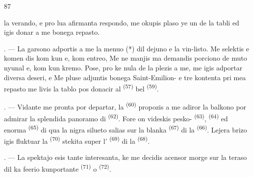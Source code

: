 \begin{VUpage}[89]{87}

\VUcontinue
la verando, e pro lua afirmanta respondo, me\nl
okupis plaso ye un de la tabli ed igis donar a\nl
me bonega repasto.

\VUsaut{4.0mm}
\VUsaut{3.0mm}

. --- La garsono adportis a me la menuo (*)\nl
dil dejuno e la vin-listo. Me selektis e komen\cc
dis kom  kun  e, kom\nl
entreo,  Me ne\nl
manjis  ma demandis porciono de muto\cc
nyunal  e, kom  kun\nl
kremo. Pose, pro ke nula de la  plezis\nl
a me, me igis adportar diversa deseri, \nl
{} e  Me pluse adjuntis bonega\nl
Saint-Emilion- e tre kontenta pri mea\nl
repasto me livis la tablo pos donacir al \cc
{} \textsuperscript{(57)} bel  \textsuperscript{(59)}.

. --- Vidante me pronta por departar, la\nl
{} \textsuperscript{(60)} propozis a me adiror la balkono por\nl
admirar la splendida panoramo di  \textsuperscript{(62)}.\nl
Fore on videskis pesko- \textsuperscript{(63)}, \cc
{} \textsuperscript{(64)} ed enorma  \textsuperscript{(65)} di qua la nigra\nl
silueto salias sur la blanka  \textsuperscript{(67)} di la \cc
{} \textsuperscript{(66)}. Lejera brizo igis fluktuar la \cc
{} \textsuperscript{(70)} stekita super l' \textsuperscript{(69)} di la\nl
{} \textsuperscript{(68)}.

\VUsaut{3.0mm}
\VUsaut{3.0mm}

. --- La spektajo esis tante interesanta, ke\nl
me decidis acensor morge sur la teraso dil ka\cc
feerio kunportante  \textsuperscript{(71)} o  \textsuperscript{(72)}.
\end{VUpage}


